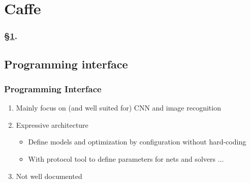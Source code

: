 
\section{Caffe}\label{sec:Caffe}


\frameinlbffalse

{

\begin{frame}[plain]
\frametitle{\S\ref{sec:Caffe}. \insertsection}
\listofframes
\end{frame}
\addtocounter{framenumber}{-1} %

}

\frameinlbftrue

\subsection{Programming interface}

\begin{frame}
  \MyLogo
  \frametitle{Programming Interface}  

\begin{enumerate}
\item Mainly focus on (and well suited for) CNN and image recognition 
\item Expressive architecture 
\begin{itemize}
\item Define models and optimization by configuration without hard-coding
\item With protocol tool to define parameters for nets and solvers $\ldots$
\end{itemize}
\item Not well documented
\end{enumerate}

\end{frame}

